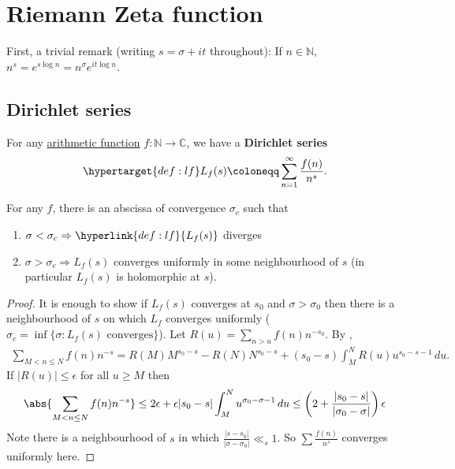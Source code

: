 \documentclass{article}
\newcommand{\named}[1]{\textbf{#1}\index{#1}}
\begin{document}
\clearpage
\section{Riemann Zeta function}
\newlec
First, a trivial remark (writing $s = \sigma + it$ throughout):
If $n \in \mathbb{N}$, $n^s = e^{s \log n} = n^\sigma e^{it \log n}$.

\subsection{Dirichlet series}
For any \hyperlink{def:arith}{arithmetic function} $f: \mathbb{N} \to \mathbb{C}$, we have a \textbf{Dirichlet series}
\begin{align*}
  \hypertarget{def:lf}L_f(s) \coloneqq \sum_{n=1}^\infty \frac{f(n)}{n^s}.
\end{align*}
\begin{nlemma}
  For any $f$, there is an abscissa of convergence $\sigma_c$ such that
  \begin{enumerate}[label=(\arabic*)]
    \item $\sigma < \sigma_c \Rightarrow \hyperlink{def:lf}{L_f(s)}$ diverges
    \item $\sigma > \sigma_c \Rightarrow L_f(s)$ converges uniformly in some neighbourhood of $s$ (in particular $L_f(s)$ is holomorphic at $s$).
  \end{enumerate}
\end{nlemma}
\begin{proof}
  It is enough to show if \hyperlink{def:lf}{$L_f(s)$} converges at $s_0$ and $\sigma > \sigma_0$ then there is a neighbourhood of $s$ on which $L_f$ converges uniformly ($\sigma_c = \inf\{\sigma : L_f(s) \text{ converges}\}$).
  Let $R(u) = \sum_{n > u} f(n) n^{-s_0}$.
  By ,
  \begin{align*}
    \sum_{M < n \leq N} f(n) n^{-s} = R(M) M^{s_0 - s} - R(N) N^{s_0 - s} + (s_0 - s) \int_M^N R(u) u^{s_0 - s - 1} \, du.
  \end{align*}
  If $|R(u)| \leq \epsilon$ for all $u \geq M$ then
  \begin{align*}
    \abs{\sum_{M < n \leq N} f(n) n^{-s}} \leq 2\epsilon + \epsilon |s_0 - s| \int_M^N u^{\sigma_0 - \sigma - 1} \, du \leq \left(2 + \frac{|s_0 - s|}{|\sigma_0 - \sigma|}\right) \epsilon
  \end{align*}
  Note there is a neighbourhood of $s$ in which $\frac{|s-s_0|}{|\sigma-\sigma_0|} \ll_s 1$. So $\sum \frac{f(n)}{n^{s}}$ converges uniformly here.
\end{proof}
\end{document}
